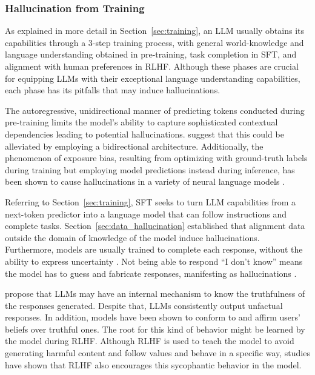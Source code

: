 \documentclass[english, 12pt, a4paper, sci, utf8, a-2b, online]{latex/definitions/aaltothesis}
\begin{document}
\subsubsection{Hallucination from Training} \label{sec:training_hallucination}

As explained in more detail in Section~\ref{sec:training}, an LLM usually obtains its capabilities through a 3-step training process, with general world-knowledge and language understanding obtained in pre-training, task completion in SFT, and alignment with human preferences in RLHF. Although these phases are crucial for equipping LLMs with their exceptional language understanding capabilities, each phase has its pitfalls that may induce hallucinations.

The autoregressive, unidirectional manner of predicting tokens conducted during pre-training limits the model's ability to capture sophisticated contextual dependencies leading to potential hallucinations. \textcite{li2023batgptbidirectionalautoregessivetalker} suggest that this could be alleviated by employing a bidirectional architecture. Additionally, the phenomenon of exposure bias, resulting from optimizing with ground-truth labels during training but employing model predictions instead during inference, has been shown to cause hallucinations in a variety of neural language models \cite{wang-sennrich-2020-exposure}.

Referring to Section~\ref{sec:training}, SFT seeks to turn LLM capabilities from a next-token predictor into a language model that can follow instructions and complete tasks. Section~\ref{sec:data_hallucination} established that alignment data outside the domain of knowledge of the model induce hallucinations. Furthermore, models are usually trained to complete each response, without the ability to express uncertainty \cite{Kalai2025-fl}. Not being able to respond ``I don't know'' means the model has to guess and fabricate responses, manifesting as hallucinations \cite{yang2024alignmenthonesty, zhang2024rtuninginstructinglargelanguage}.

\textcite{azaria2023internalstatellmknows} propose that LLMs may have an internal mechanism to know the truthfulness of the responses generated. Despite that, LLMs consistently output unfactual responses. In addition, models have been shown to conform to and affirm users' beliefs over truthful ones. The root for this kind of behavior might be learned by the model during RLHF. Although RLHF is used to teach the model to avoid generating harmful content and follow values and behave in a specific way, studies \cite{sharma2025understandingsycophancylanguagemodels, wei2024simplesyntheticdatareduces} have shown that RLHF also encourages this sycophantic behavior in the model.
\end{document}
